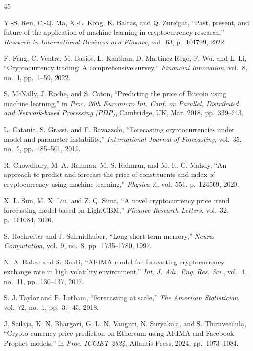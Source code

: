 \documentclass[conference]{IEEEtran}
\begin{document}

\begin{thebibliography}{45}

Y.-S. Ren, C.-Q. Ma, X.-L. Kong, K. Baltas, and Q. Zureigat, ``Past, present, and future of the application of machine learning in cryptocurrency research,'' \textit{Research in International Business and Finance}, vol.~63, p.~101799, 2022.

F. Fang, C. Ventre, M. Basios, L. Kanthan, D. Martinez-Rego, F. Wu, and L. Li, ``Cryptocurrency trading: A comprehensive survey,'' \textit{Financial Innovation}, vol.~8, no.~1, pp.~1--59, 2022.

S. McNally, J. Roche, and S. Caton, ``Predicting the price of Bitcoin using machine learning,'' in \textit{Proc. 26th Euromicro Int. Conf. on Parallel, Distributed and Network-based Processing (PDP)}, Cambridge, UK, Mar. 2018, pp.~339--343.

L. Catania, S. Grassi, and F. Ravazzolo, ``Forecasting cryptocurrencies under model and parameter instability,'' \textit{International Journal of Forecasting}, vol.~35, no.~2, pp.~485--501, 2019.

R. Chowdhury, M. A. Rahman, M. S. Rahman, and M. R. C. Mahdy, ``An approach to predict and forecast the price of constituents and index of cryptocurrency using machine learning,'' \textit{Physica A}, vol.~551, p.~124569, 2020.

X. L. Sun, M. X. Liu, and Z. Q. Sima, ``A novel cryptocurrency price trend forecasting model based on LightGBM,'' \textit{Finance Research Letters}, vol.~32, p.~101084, 2020.

S. Hochreiter and J. Schmidhuber, ``Long short-term memory,'' \textit{Neural Computation}, vol.~9, no.~8, pp.~1735--1780, 1997.

N. A. Bakar and S. Rosbi, ``ARIMA model for forecasting cryptocurrency exchange rate in high volatility environment,'' \textit{Int. J. Adv. Eng. Res. Sci.}, vol.~4, no.~11, pp.~130--137, 2017.

S. J. Taylor and B. Letham, ``Forecasting at scale,'' \textit{The American Statistician}, vol.~72, no.~1, pp.~37--45, 2018.

J. Sailaja, K. N. Bhargavi, G. L. N. Vanguri, N. Suryakala, and S. Thiruveedula, ``Crypto currency price prediction on Ethereum using ARIMA and Facebook Prophet models,'' in \textit{Proc. ICCIET 2024}, Atlantis Press, 2024, pp.~1073--1084.


\end{thebibliography}
\end{document}

